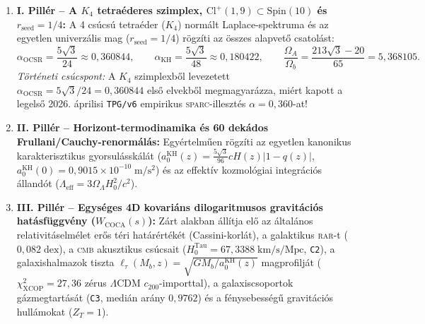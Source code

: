 \documentclass[11pt,a4paper]{article}
\begin{document}
\begin{enumerate}[leftmargin=1.5em]
\item \textbf{I. Pillér -- A $K_4$ tetraéderes szimplex, $\mathrm{Cl}^+(1,9)\subset\mathrm{Spin}(10)$ és $r_{\mathrm{seed}} = 1/4$:}
A 4 csúcsú tetraéder ($K_4$) normált Laplace-spektruma és az egyetlen univerzális mag ($r_{\mathrm{seed}} = 1/4$) rögzíti az összes alapvet\H{o} csatolást:
\begin{equation}
\alpha_{\mathrm{OCSR}} = \frac{5\sqrt{3}}{24} \approx 0{,}360844, \qquad \alpha_{\mathrm{KH}} = \frac{5\sqrt{3}}{48} \approx 0{,}180422, \qquad \frac{\Omega_A}{\Omega_b} = \frac{213\sqrt{3}-20}{65} = 5{,}368105.
\end{equation}
\emph{Történeti csúcspont:} A $K_4$ szimplexb\H{o}l levezetett $\alpha_{\mathrm{OCSR}} = 5\sqrt{3}/24 = 0{,}360844$ els\H{o} elvekb\H{o}l megmagyarázza, miért kapott a legels\H{o} 2026. áprilisi \texttt{TPG/v6} empirikus \textsc{sparc}-illesztés $\alpha = 0{,}360$-at!
\item \textbf{II. Pillér -- Horizont-termodinamika és 60 dekádos Frullani/Cauchy-renormálás:}
Egyértelm\H{u}en rögzíti az egyetlen kanonikus karakterisztikus gyorsulásskálát ($a_0^{\mathrm{KH}}(z) = \frac{5\sqrt{3}}{96}cH(z)|1 - q(z)|$, $a_0^{\mathrm{KH}}(0) = 0{,}9015\times 10^{-10}\;\mathrm{m/s^2}$) és az effektív kozmológiai integrációs állandót ($\Lambda_{\mathrm{eff}} = 3\Omega_\Lambda H_0^2/c^2$).
\item \textbf{III. Pillér -- Egységes 4D kovariáns dilogaritmusos gravitációs hatásfüggvény ($W_{\mathrm{COCA}}(s)$):}
Zárt alakban állítja el\H{o} az általános relativitáselmélet er\H{o}s téri határértékét (Cassini-korlát), a galaktikus \textsc{rar}-t ($0{,}082\;\mathrm{dex}$), a \textsc{cmb} akusztikus csúcsait ($H_0^{\mathrm{Tau}} = 67{,}3388\;\mathrm{km/s/Mpc}$, \texttt{C2}), a galaxishalmazok tiszta $\ell_\tau(M_b,z)=\sqrt{GM_b/a_0^{\mathrm{KH}}(z)}$ magprofilját ($\chi^2_{\mathrm{XCOP}}=27{,}36$ zérus $\Lambda$CDM $c_{200}$-importtal), a galaxiscsoportok gázmegtartását (\texttt{C3}, medián arány $0{,}9762$) és a fénysebesség\H{u} gravitációs hullámokat ($Z_T = 1$).
\end{enumerate}
\end{document}
